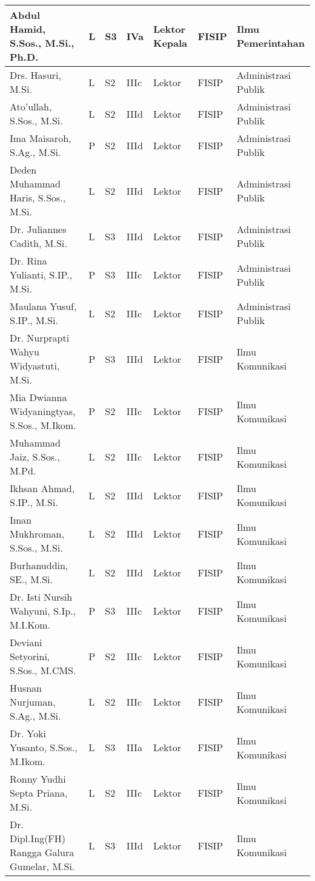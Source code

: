 \documentclass[
]{book}
\begin{document}
\begin{longtable}{l|l|l|l|l|l|l}
\hline
Abdul Hamid, S.Sos., M.Si., Ph.D. & L & S3 & IVa & Lektor Kepala & FISIP & Ilmu Pemerintahan\\
\hline
Drs. Hasuri, M.Si. & L & S2 & IIIc & Lektor & FISIP & Administrasi Publik\\
\hline
Ato'ullah, S.Sos., M.Si. & L & S2 & IIId & Lektor & FISIP & Administrasi Publik\\
\hline
Ima Maisaroh, S.Ag., M.Si. & P & S2 & IIId & Lektor & FISIP & Administrasi Publik\\
\hline
Deden Muhammad Haris, S.Sos., M.Si. & L & S2 & IIId & Lektor & FISIP & Administrasi Publik\\
\hline
Dr. Juliannes Cadith, M.Si. & L & S3 & IIId & Lektor & FISIP & Administrasi Publik\\
\hline
Dr. Rina Yulianti, S.IP., M.Si. & P & S3 & IIIc & Lektor & FISIP & Administrasi Publik\\
\hline
Maulana Yusuf, S.IP., M.Si. & L & S2 & IIIc & Lektor & FISIP & Administrasi Publik\\
\hline
Dr. Nurprapti Wahyu Widyastuti, M.Si. & P & S3 & IIId & Lektor & FISIP & Ilmu Komunikasi\\
\hline
Mia Dwianna Widyaningtyas, S.Sos., M.Ikom. & P & S2 & IIIc & Lektor & FISIP & Ilmu Komunikasi\\
\hline
Muhammad Jaiz, S.Sos., M.Pd. & L & S2 & IIIc & Lektor & FISIP & Ilmu Komunikasi\\
\hline
Ikhsan Ahmad, S.IP., M.Si. & L & S2 & IIId & Lektor & FISIP & Ilmu Komunikasi\\
\hline
Iman Mukhroman, S.Sos., M.Si. & L & S2 & IIId & Lektor & FISIP & Ilmu Komunikasi\\
\hline
Burhanuddin, SE., M.Si. & L & S2 & IIId & Lektor & FISIP & Ilmu Komunikasi\\
\hline
Dr. Isti Nursih Wahyuni, S.Ip., M.I.Kom. & P & S3 & IIIc & Lektor & FISIP & Ilmu Komunikasi\\
\hline
Deviani Setyorini, S.Sos., M.CMS. & P & S2 & IIIc & Lektor & FISIP & Ilmu Komunikasi\\
\hline
Husnan Nurjuman, S.Ag., M.Si. & L & S2 & IIIc & Lektor & FISIP & Ilmu Komunikasi\\
\hline
Dr. Yoki Yusanto, S.Sos., M.Ikom. & L & S3 & IIIa & Lektor & FISIP & Ilmu Komunikasi\\
\hline
Ronny Yudhi Septa Priana, M.Si. & L & S2 & IIIc & Lektor & FISIP & Ilmu Komunikasi\\
\hline
Dr. Dipl.Ing(FH) Rangga Galura Gumelar, M.Si. & L & S3 & IIId & Lektor & FISIP & Ilmu Komunikasi\\

\end{longtable}
\end{document}
